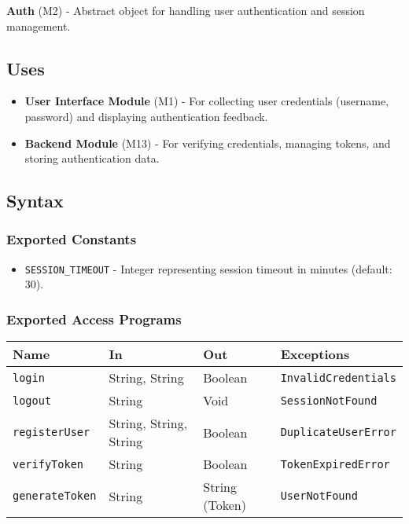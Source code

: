 \documentclass[12pt, titlepage]{article}
\begin{document}
\textbf{Auth} (M2) - Abstract object for handling user authentication and session management.

\subsection{Uses}

\begin{itemize}
	\item \textbf{User Interface Module} (M1) - For collecting user credentials (username, password)
	and displaying authentication feedback.
	\item \textbf{Backend Module} (M13) - For verifying credentials, managing tokens, and storing
	authentication data.
\end{itemize}


\subsection{Syntax}

\subsubsection{Exported Constants}
\begin{itemize}
	\item \texttt{SESSION\_TIMEOUT} - Integer representing session timeout in minutes (default: 30).
\end{itemize}

\subsubsection{Exported Access Programs}

\begin{center}
\begin{tabular}{|p{3cm} | p{4cm} | p{4cm} | p{4cm}|}
\hline
\textbf{Name} & \textbf{In} & \textbf{Out} & \textbf{Exceptions} \\
\hline
\texttt{login} & String, String & Boolean & \texttt{InvalidCredentials} \\
\texttt{logout} & String & Void & \texttt{SessionNotFound} \\
\texttt{registerUser} & String, String, String & Boolean & \texttt{DuplicateUserError} \\
\texttt{verifyToken} & String & Boolean & \texttt{TokenExpiredError} \\
\texttt{generateToken} & String & String (Token) & \texttt{UserNotFound} \\
\hline
\end{tabular}
\end{center}
\end{document}
